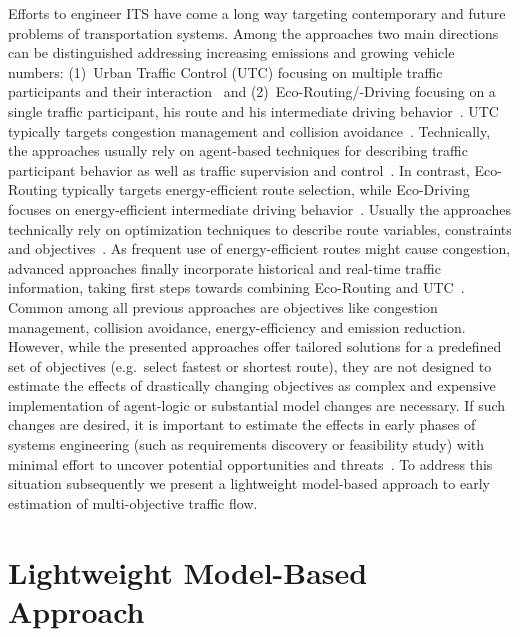 \documentclass[conference]{../cls/IEEEtran}
\begin{document}
Efforts to engineer ITS have come a long way targeting contemporary and future
problems of transportation systems. Among the approaches two main directions can
be distinguished addressing increasing emissions and growing vehicle numbers:
(1)~Urban Traffic Control (UTC) focusing on multiple traffic participants and
their interaction~\cite{Chen2010} and (2)~Eco-Routing/-Driving focusing
on a single traffic participant, his route and his intermediate driving
behavior~\cite{Ericsson2006,Boriboonsomsin2012}. UTC typically targets
congestion management and collision avoidance~\cite{Chen2010}. Technically, the
approaches usually rely on agent-based techniques for describing traffic
participant behavior as well as traffic supervision and control~\cite{Chen2010}.
In contrast, Eco-Routing typically targets energy-efficient route selection,
while Eco-Driving focuses on energy-efficient intermediate driving
behavior~\cite{Ericsson2006}. Usually the approaches technically rely
on optimization techniques to describe route variables, constraints and
objectives~\cite{Ericsson2006}. As frequent use of energy-efficient routes might
cause congestion, advanced approaches finally incorporate historical and
real-time traffic information, taking first steps towards combining
Eco-Routing and UTC~\cite{Boriboonsomsin2012}. 
Common among all previous approaches are objectives like congestion management,
collision avoidance, energy-efficiency and emission reduction. 
However, while the presented approaches offer tailored solutions for a
predefined set of objectives (e.g.\ select fastest or shortest route), they are not designed to
estimate the effects of drastically changing objectives as complex
and expensive implementation of agent-logic or substantial model changes are
necessary.
If such changes are desired, it is important to
estimate the effects in early phases of systems engineering (such as
requirements discovery or feasibility study) with minimal effort to uncover
potential opportunities and threats~\cite{Whitten2005}. To address this
situation subsequently we present a lightweight model-based approach to early
estimation of multi-objective traffic flow.

\section{Lightweight Model-Based Approach}
\label{sec:approach}
\end{document}

